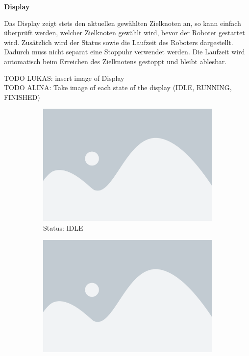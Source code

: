 \textbf{Display}\label{peripherie-display}

Das Display zeigt stets den aktuellen gewählten Zielknoten an, so kann einfach überprüft werden, welcher Zielknoten gewählt wird, bevor der Roboter gestartet wird. 
Zusätzlich wird der Status sowie die Laufzeit des Roboters dargestellt. Dadurch muss nicht separat eine Stoppuhr verwendet werden. Die Laufzeit wird automatisch beim Erreichen des Zielknotens gestoppt und bleibt ablesbar.

TODO LUKAS: insert image of Display\\
TODO ALINA: Take image of each state of the display (IDLE, RUNNING, FINISHED)

\begin{figure}[H]
    \centering
    \begin{subfigure}[t]{0.30\textwidth}
        \includegraphics[width=\linewidth]{assets/placeholder.png}
    \caption*{Status: IDLE}
    \end{subfigure}
    \hfill
    \begin{subfigure}[t]{0.30\textwidth}
        \includegraphics[width=\linewidth]{assets/placeholder.png}

\end{subfigure}
\end{figure}
